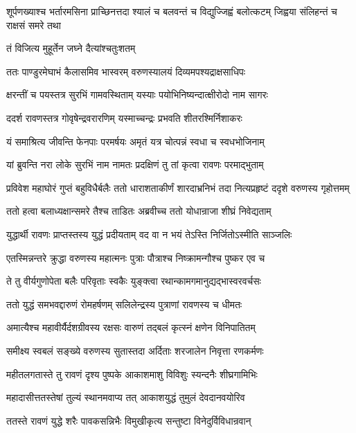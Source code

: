 \threelineshloka
{शूर्पणख्याश्च भर्तारमसिना प्राच्छिनत्तदा}
{श्यालं च बलवन्तं च विद्युज्जिह्वं बलोत्कटम्}
{जिह्वया संलिहन्तं च राक्षसं समरे तथा} %

\onelineshloka
{तं विजित्य मुहूर्तेन जघ्ने दैत्यांश्चतुःशतम्} %

\twolineshloka
{ततः पाण्डुरमेघाभं कैलासमिव भास्वरम्}
{वरुणस्यालयं दिव्यमपश्यद्राक्षसाधिपः} %

\twolineshloka
{क्षरन्तीं च पयस्तत्र सुरभिं गामवस्थिताम्}
{यस्याः पयोभिनिष्यन्दात्क्षीरोदो नाम सागरः} %

\twolineshloka
{ददर्श रावणस्तत्र गोवृषेन्द्रवरारणिम्}
{यस्माच्चन्द्रः प्रभवति शीतरश्मिर्निशाकरः} %

\twolineshloka
{यं समाश्रित्य जीवन्ति फेनपाः परमर्षयः}
{अमृतं यत्र चोत्पन्नं स्वधा च स्वधभोजिनाम्} %

\twolineshloka
{यां ब्रुवन्ति नरा लोके सुरभिं नाम नामतः}
{प्रदक्षिणं तु तां कृत्वा रावणः परमाद्भुताम्} %

\threelineshloka
{प्रविवेश महाघोरं गुप्तं बहुविधैर्बलैः}
{ततो धाराशताकीर्णं शारदाभ्रनिभं तदा}
{नित्यप्रहृष्टं ददृशे वरुणस्य गृहोत्तमम्} %

\twolineshloka
{ततो हत्वा बलाध्यक्षान्समरे तैश्च ताडितः}
{अब्रवीच्च ततो योधान्राजा शीघ्रं निवेद्यताम्} %

\twolineshloka
{युद्धार्थी रावणः प्राप्तस्तस्य युद्धं प्रदीयताम्}
{वद वा न भयं तेऽस्ति निर्जितोऽस्मीति साञ्जलिः} %

\twolineshloka
{एतस्मिन्नन्तरे क्रुद्धा वरुणस्य महात्मनः}
{पुत्राः पौत्राश्च निष्क्रामन्गौश्च पुष्कर एव च} %

\twolineshloka
{ते तु वीर्यगुणोपेता बलैः परिवृताः स्वकैः}
{युङ्क्त्वा रथान्कामगमानुद्यद्भास्वरवर्चसः} %

\twolineshloka
{ततो युद्धं समभवद्दारुणं रोमहर्षणम्}
{सलिलेन्द्रस्य पुत्राणां रावणस्य च धीमतः} %

\twolineshloka
{अमात्यैश्च महावीर्यैर्दशग्रीवस्य रक्षसः}
{वारुणं तद्बलं कृत्स्नं क्षणेन विनिपातितम्} %

\twolineshloka
{समीक्ष्य स्वबलं सङ्ख्ये वरुणस्य सुतास्तदा}
{अर्दिताः शरजालेन निवृत्ता रणकर्मणः} %

\twolineshloka
{महीतलगतास्ते तु रावणं दृश्य पुष्पके}
{आकाशमाशु विविशुः स्यन्दनैः शीघ्रगामिभिः} %

\twolineshloka
{महादासीत्ततस्तेषां तुल्यं स्थानमवाप्य तत्}
{आकाशयुद्धं तुमुलं देवदानवयोरिव} %

\twolineshloka
{ततस्ते रावणं युद्धे शरैः पावकसन्निभैः}
{विमुखीकृत्य सन्तुष्टा विनेदुर्विविधान्रवान्} %

